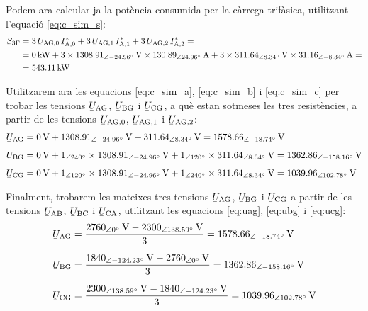 \begin{exemple}
    Podem ara  calcular ja  la potència consumida per la càrrega
    trifàsica, utilitzant l'equació \eqref{eq:c_sim_s}:
    \[
    \begin{split}
    \cmplx{S}\ped{3F} &=  3\,
    \cmplx{U}\ped{AG,0}\,  \cmplx{I}\ped{A,0}^* +
    3\, \cmplx{U}\ped{AG,1}\,
    \cmplx{I}\ped{A,1}^* + 3\, \cmplx{U}\ped{AG,2}\,
    \cmplx{I}\ped{A,2}^*  = \\
    &= \SI{0}{kW} + 3 \times \SIpd{1308,91}{-24,96}{V} \times
    \SIpd{130,89}{24,96}{A} + 3 \times
    \SIpd{311,64}{8,34}{V} \times \SIpd{31,16}{-8,34}{A} = \\
    &= \SI{543,11}{kW}
    \end{split}
    \]

    Utilitzarem ara les equacions \eqref{eq:c_sim_a},
    \eqref{eq:c_sim_b} i \eqref{eq:c_sim_c} per trobar les tensions $\cmplx{U}\ped{AG}$, $\cmplx{U}\ped{BG}$ i $\cmplx{U}\ped{CG}$, a què
    estan sotmeses les tres resistències, a partir de les  tensions $\cmplx{U}\ped{AG,0}$, $\cmplx{U}\ped{AG,1}$ i $\cmplx{U}\ped{AG,2}$:
    \begin{align*}
        \cmplx{U}\ped{AG} &= \SI{0}{V} + \SIpd{1308,91}{-24,96}{V} +
        \SIpd{311,64}{8,34}{V}  =
        \SIpd{1578,66}{-18,74}{V} \\[1ex]
        \cmplx{U}\ped{BG} &= \SI{0}{V} + \numpd{1}{240} \times
        \SIpd{1308,91}{-24,96}{V} +
        \numpd{1}{120} \times
        \SIpd{311,64}{8,34}{V}  =
        \SIpd{1362,86}{-158,16}{V}    \\[1ex]
        \cmplx{U}\ped{CG} &= \SI{0}{V} + \numpd{1}{120} \times
        \SIpd{1308,91}{-24,96}{V} +
        \numpd{1}{240} \times \SIpd{311,64}{8,34}{V}  =
        \SIpd{1039,96}{102,78}{V}
    \end{align*}

    Finalment, trobarem les mateixes tres tensions $\cmplx{U}\ped{AG}$, $\cmplx{U}\ped{BG}$ i $\cmplx{U}\ped{CG}$ a partir de les tensions $\cmplx{U}\ped{AB}$, $\cmplx{U}\ped{BC}$ i $\cmplx{U}\ped{CA}$, utilitzant les equacions \eqref{eq:uag}, \eqref{eq:ubg} i \eqref{eq:ucg}:
    \begin{align*}
        \cmplx{U}\ped{AG} &= \frac{\SIpd{2760}{0}{V}-\SIpd{2300}{138,59}{V}}{3}
        = \SIpd{1578,66}{-18,74}{V} \\[1.5ex]
        \cmplx{U}\ped{BG} &= \frac{\SIpd{1840}{-124,23}{V}-\SIpd{2760}{0}{V}}{3}  =
        \SIpd{1362,86}{-158,16}{V}  \\[1.5ex]
        \cmplx{U}\ped{CG} &= \frac{\SIpd{2300}{138,59}{V}-\SIpd{1840}{-124,23}{V}}{3}  = \SIpd{1039,96}{102,78}{V}
    \end{align*}
\end{exemple}


